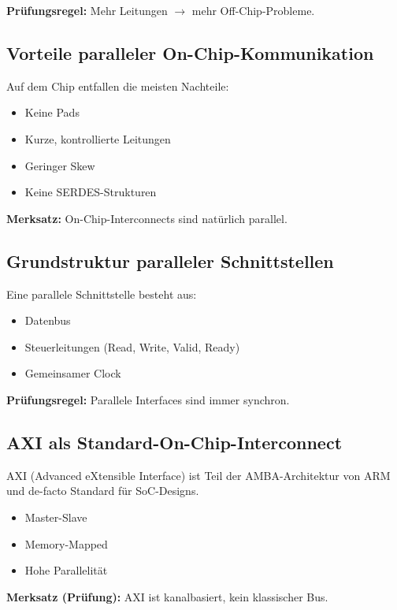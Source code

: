 \documentclass[11pt,a4paper]{article}
\newcommand{\hilite}[1]{\colorbox{yellow!25}{#1}}
\newcommand{\imp}[1]{\textbf{\textcolor{codeemph}{#1}}}
\begin{document}
\imp{Prüfungsregel:}  
\hilite{Mehr} \hilite{Leitungen} $\rightarrow$ \hilite{mehr} Off-Chip-Probleme.

\subsection{Vorteile paralleler On-Chip-Kommunikation}
Auf dem Chip entfallen die meisten Nachteile:

\begin{itemize}
  \item Keine Pads
  \item Kurze, kontrollierte Leitungen
  \item Geringer Skew
  \item Keine SERDES-Strukturen
\end{itemize}

\textbf{Merksatz:}  
\hilite{On-Chip-}\hilite{Interconnect}s sind \hilite{natürlich} parallel.

\subsection{Grundstruktur paralleler Schnittstellen}
Eine parallele Schnittstelle besteht aus:

\begin{itemize}
  \item Datenbus
  \item Steuerleitungen (Read, Write, Valid, Ready)
  \item Gemeinsamer Clock
\end{itemize}

\imp{Prüfungsregel:}  
\hilite{Parallele} \hilite{Interfaces} sind immer \hilite{synchron}.

\subsection{AXI als Standard-On-Chip-Interconnect}
AXI (Advanced eXtensible Interface) ist Teil der AMBA-Architektur von ARM und de-facto Standard für SoC-Designs.

\begin{itemize}
  \item Master-Slave
  \item Memory-Mapped
  \item Hohe Parallelität
\end{itemize}

\imp{Merksatz (Prüfung):}  
\hilite{AXI} ist \hilite{kanalbasiert}, kein \hilite{klassischer} Bus.
\end{document}
